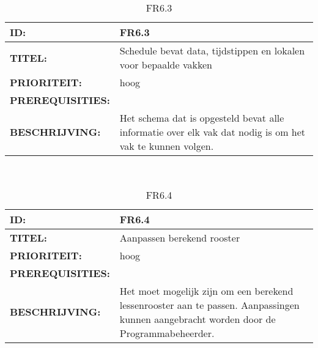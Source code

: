 \noindent\begin{table}[h]
            \begin{tabular}{l | p{10cm}}
                \textbf{ID:} & FR6.3 \\ \hline
                \textbf{TITEL:} & Schedule bevat data, tijdstippen en lokalen voor bepaalde vakken\\ \hline
                \textbf{PRIORITEIT:} &  hoog \\ \hline
                \textbf{PREREQUISITIES:} & \\ \hline
                \textbf{BESCHRIJVING:} & Het schema dat is opgesteld bevat alle informatie over elk vak dat nodig is om het vak te kunnen volgen.\\
            \end{tabular}\\
            \caption{FR6.3}
            \label{tab:mysixteenthtable}
        \end{table}
        
\noindent\begin{table}[h]
            \begin{tabular}{l | p{10cm}}
                \textbf{ID:} & FR6.4 \\ \hline
                \textbf{TITEL:} & Aanpassen berekend rooster \\ \hline
                \textbf{PRIORITEIT:} &  hoog \\ \hline
                \textbf{PREREQUISITIES:} & \\ \hline
                \textbf{BESCHRIJVING:} & Het moet mogelijk zijn om een berekend lessenrooster aan te passen. Aanpassingen kunnen aangebracht worden door de Programmabeheerder.\\
            \end{tabular}\\
            \caption{FR6.4}
            \label{tab:mysixteenthtable}
        \end{table}
        
